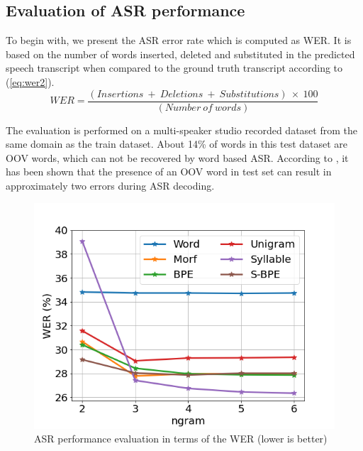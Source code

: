 \subsection{Evaluation of ASR performance}

\label{sec:WER}

To begin with, we present the ASR error rate which is computed as WER. It is
based on the number of words inserted, deleted and substituted  in
the predicted speech transcript when compared to the ground truth transcript
according to (\ref{eq:wer2}).
\begin{equation}
	\label{eq:wer2}
	WER = \frac{(Insertions\ +\ Deletions\ +\ Substitutions)\ \times\ 100}{(Number\ of\ words)}
\end{equation}

The evaluation is performed on a multi-speaker studio recorded dataset from the
same domain as the train dataset. About 14\% of words in this test dataset are
OOV words, which can not be recovered by word based ASR. According to
\cite{bisani2005open}, it has been shown that the presence of an OOV word in
test set can result in approximately two errors during ASR decoding.

\begin{figure}[ht]
    \centering
    \includegraphics[width=0.8\linewidth]{WER.png}
    \caption{ASR performance evaluation in terms of the WER (lower is better)}
    \label{fig:WER}
\end{figure}

